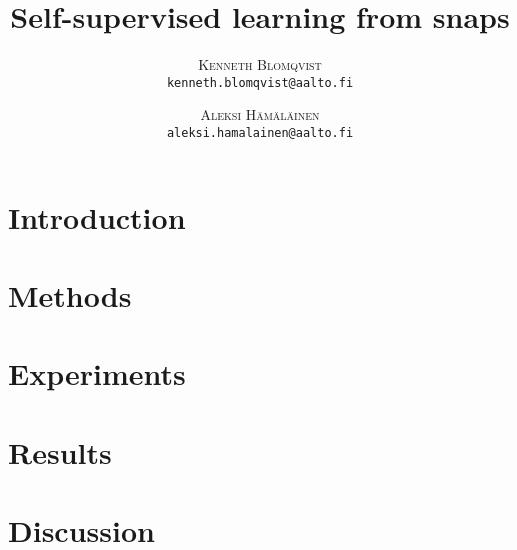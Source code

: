 \documentclass[twoside]{article}
\title{\vspace{-15mm}\fontsize{24pt}{10pt}\textbf{Self-supervised learning from snaps}}
\author{
  \large
  \textsc{Kenneth Blomqvist}\\[2mm]
  \texttt{kenneth.blomqvist@aalto.fi}\\[2mm]
  \and
  \textsc{Aleksi Hämäläinen}\\[2mm]
  \texttt{aleksi.hamalainen@aalto.fi}\\[2mm]
}
\date{}
\begin{document}
\maketitle %


\begin{abstract}
  
\end{abstract}


\begin{multicols}{2} %

  \section{Introduction}
  \label{sec:introduction}
  

  \section{Methods}
  \label{sec:methods}
  

  \section{Experiments}
  \label{sec:experiments}
  

  \section{Results}
  \label{sec:results}
  

  \section{Discussion}
  \label{sec:discussion}
  



  
  

\end{multicols} %
\pagebreak

\end{document}
